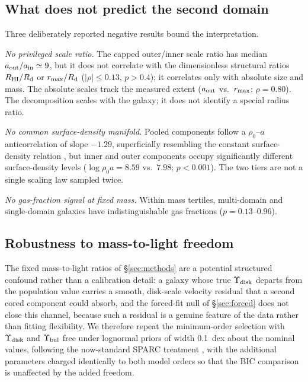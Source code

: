 \documentclass[twocolumn]{aastex701}
\begin{document}
\subsection{What does not predict the second domain} \label{sec:negatives}

Three deliberately reported negative results bound the interpretation.

\emph{No privileged scale ratio.} The capped outer/inner scale ratio has
median $a_{\rm out}/a_{\rm in} \simeq 9$, but it does not correlate with the
dimensionless structural ratios $R_{\rm HI}/R_{\rm d}$ or
$r_{\rm max}/R_{\rm d}$ ($|\rho| \le 0.13$, $p > 0.4$); it correlates only
with absolute size and mass. The absolute scales track the measured extent
($a_{\rm out}$ vs.\ $r_{\rm max}$: $\rho = 0.80$). The decomposition scales
with the galaxy; it does not identify a special radius ratio.

\emph{No common surface-density manifold.} Pooled components follow a
$\rho_0$--$a$ anticorrelation of slope $-1.29$, superficially resembling the
constant surface-density relation \citep{Donato2009}, but inner and outer
components occupy significantly different surface-density levels
($\log \rho_0 a = 8.59$ vs.\ $7.98$; $p < 0.001$). The two tiers are not a
single scaling law sampled twice.

\emph{No gas-fraction signal at fixed mass.} Within mass tertiles,
multi-domain and single-domain galaxies have indistinguishable gas fractions
($p = 0.13$--$0.96$).

\subsection{Robustness to mass-to-light freedom} \label{sec:freeml}

The fixed mass-to-light ratios of \S\ref{sec:methods} are a potential
structured confound rather than a calibration detail: a galaxy whose true
$\Upsilon_{\rm disk}$ departs from the population value carries a smooth,
disk-scale velocity residual that a second cored component could absorb, and
the forced-fit null of \S\ref{sec:forced} does not close this channel,
because such a residual is a genuine feature of the data rather than fitting
flexibility. We therefore repeat the minimum-order selection with
$\Upsilon_{\rm disk}$ and $\Upsilon_{\rm bul}$ free under lognormal priors
of width 0.1~dex about the nominal values, following the now-standard SPARC
treatment \citep{Li2020}, with the additional parameters charged identically
to both model orders so that the BIC comparison is unaffected by the added
freedom.
\end{document}
